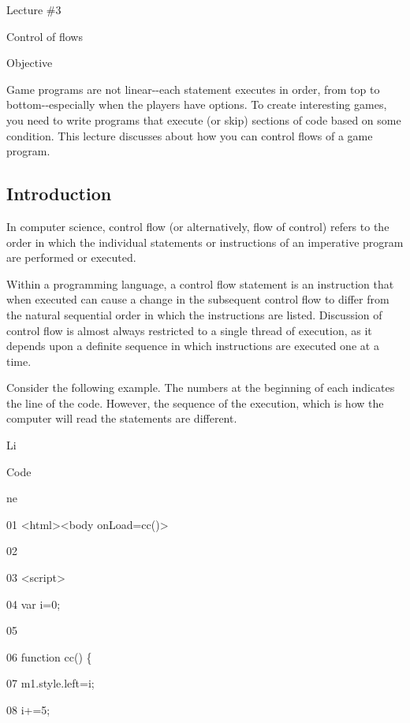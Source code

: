 \documentclass[
]{article}
\begin{document}
\protect\hypertarget{index_split_003.htmlux5cux23p39}{}{}

Lecture \#3

Control of flows

Objective

Game programs are not linear-\/-each statement executes in order, from
top to bottom-\/-especially when the players have options. To create
interesting games, you need to write programs that execute (or skip)
sections of code based on some condition. This lecture discusses about
how you can control flows of a game program.

\protect\hypertarget{index_split_004.html}{}{}

\hypertarget{index_split_004.htmlux5cux23calibre_pb_3}{%
\subsection{Introduction}\label{index_split_004.htmlux5cux23calibre_pb_3}}

In computer science, control flow (or alternatively, flow of control)
refers to the order in which the individual statements or instructions
of an imperative program are performed or executed.

Within a programming language, a control flow statement is an
instruction that when executed can cause a change in the subsequent
control flow to differ from the natural sequential order in which the
instructions are listed. Discussion of control flow is almost always
restricted to a single thread of execution, as it depends upon a
definite sequence in which instructions are executed one at a time.

Consider the following example. The numbers at the beginning of each
indicates the line of the code. However, the sequence of the execution,
which is how the computer will read the statements are different.

Li

Code

ne

01 \textless html\textgreater\textless body onLoad=cc()\textgreater{}

02

03 \textless script\textgreater{}

04 var i=0;

05

06 function cc() \{

07 m1.style.left=i;

08 i+=5;
\end{document}
